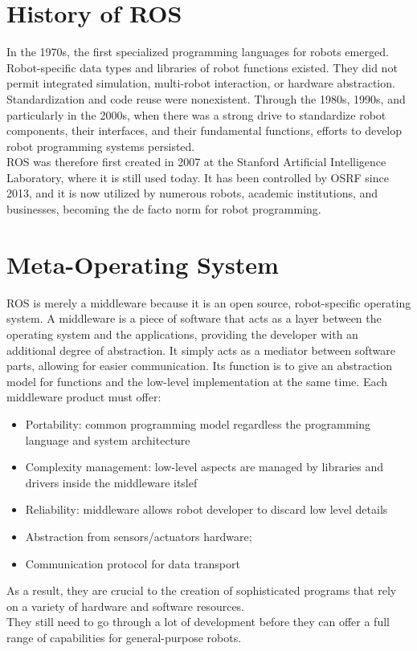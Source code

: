 \section{History of ROS}
In the 1970s, the first specialized programming languages for robots emerged.
Robot-specific data types and libraries of robot functions existed. They did not permit integrated simulation, multi-robot interaction, or hardware abstraction. Standardization and code reuse were nonexistent.
Through the 1980s, 1990s, and particularly in the 2000s, when there was a strong drive to standardize robot components, their interfaces, and their fundamental functions, efforts to develop robot programming systems persisted.
\\
ROS was therefore first created in 2007 at the Stanford Artificial Intelligence Laboratory, where it is still used today. It has been controlled by OSRF since 2013, and it is now utilized by numerous robots, academic institutions, and businesses, becoming the de facto norm for robot programming.

\section{Meta-Operating System}
ROS is merely a middleware because it is an open source, robot-specific operating system.
A middleware is a piece of software that acts as a layer between the operating system and the applications, providing the developer with an additional degree of abstraction.
It simply acts as a mediator between software parts, allowing for easier communication.
Its function is to give an abstraction model for functions and the low-level implementation at the same time.
Each middleware product must offer:
\begin{itemize}
    \item Portability: common programming model regardless the programming language and system architecture
    \item Complexity management: low-level aspects are managed by libraries and drivers inside the middleware itslef
    \item Reliability: middleware allows robot developer to discard low level details
    \item Abstraction from sensors/actuators hardware;
    \item Communication protocol for data transport
\end{itemize}
 As a result, they are crucial to the creation of sophisticated programs that rely on a variety of hardware and software resources. \\
They still need to go through a lot of development before they can offer a full range of capabilities for general-purpose robots.
 
